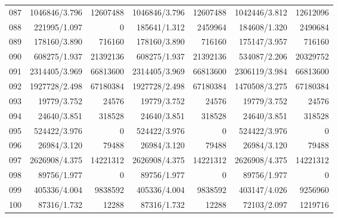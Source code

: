 \begin{longtable}{crrrrrr}
087 & 1046846/3.796 & 12607488 & 1046846/3.796 & 12607488 & 1042446/3.812 & 12612096 \\
088 & 221995/1.097 & 0 & 185641/1.312 & 2459964 & 184608/1.320 & 2490684 \\
089 & 178160/3.890 & 716160 & 178160/3.890 & 716160 & 175147/3.957 & 716160 \\
090 & 608275/1.937 & 21392136 & 608275/1.937 & 21392136 & 534087/2.206 & 20329752 \\
091 & 2314405/3.969 & 66813600 & 2314405/3.969 & 66813600 & 2306119/3.984 & 66813600 \\
092 & 1927728/2.498 & 67180384 & 1927728/2.498 & 67180384 & 1470508/3.275 & 67180384 \\
093 & 19779/3.752 & 24576 & 19779/3.752 & 24576 & 19779/3.752 & 24576 \\
094 & 24640/3.851 & 318528 & 24640/3.851 & 318528 & 24640/3.851 & 318528 \\
095 & 524422/3.976 & 0 & 524422/3.976 & 0 & 524422/3.976 & 0 \\
096 & 26984/3.120 & 79488 & 26984/3.120 & 79488 & 26984/3.120 & 79488 \\
097 & 2626908/4.375 & 14221312 & 2626908/4.375 & 14221312 & 2626908/4.375 & 14221312 \\
098 & 89756/1.977 & 0 & 89756/1.977 & 0 & 89756/1.977 & 0 \\
099 & 405336/4.004 & 9838592 & 405336/4.004 & 9838592 & 403147/4.026 & 9256960 \\
100 & 87316/1.732 & 12288 & 87316/1.732 & 12288 & 72103/2.097 & 1219716 \\
\end{longtable}


